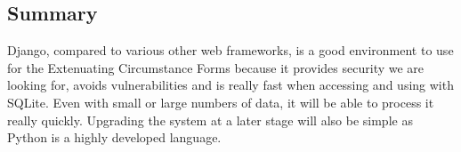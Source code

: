 \documentclass[../main.tex]{subfiles}
\begin{document}
\subsection{Summary}
Django, compared to various other web frameworks, is a good environment to use for the Extenuating Circumstance Forms because it provides security we are looking for, avoids vulnerabilities and is really fast when accessing and using with SQLite. Even with small or large numbers of data, it will be able to process it really quickly. Upgrading the system at a later stage will also be simple as Python is a highly developed language. 
\end{document}
